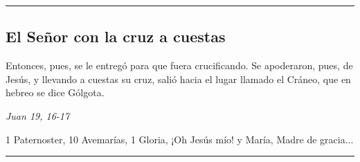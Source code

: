 \documentclass[11pt,a4paper]{book}
\begin{document}
    \rule{\textwidth}{0.5pt}
    

    \subsection*{El Señor con la cruz a cuestas}

    Entonces, pues, se le entregó para que fuera crucificando. Se apoderaron, pues, de Jesús, 
    y llevando a cuestas su cruz, salió hacia el lugar llamado el Cráneo, que en hebreo se dice Gólgota.     

    \begin{flushright}
        \emph{Juan 19, 16-17}
    \end{flushright}    

    1 Paternoster, 10 Avemarías, 1 Gloria, ¡Oh Jesús mío! y María, Madre de gracia...

    \rule{\textwidth}{0.5pt}
\end{document}
